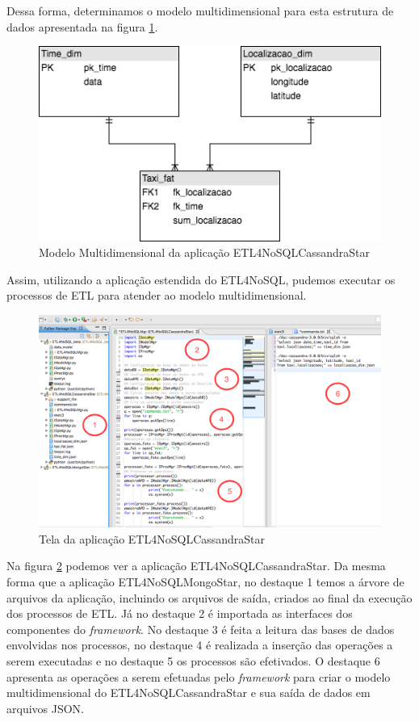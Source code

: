 Dessa forma, determinamos o modelo multidimensional para esta estrutura de dados apresentada na figura \ref{cassandramultidim}.

\begin{figure}[h!]
	\centering
	\includegraphics[scale=0.5]{fig/cassandra_multidim.png}
	\caption{Modelo Multidimensional da aplicação ETL4NoSQLCassandraStar}
	\label{cassandramultidim}
\end{figure}

Assim, utilizando a aplicação estendida do ETL4NoSQL, pudemos executar os processos de ETL para atender ao modelo multidimensional.

\begin{figure}[h!]
	\centering
	\includegraphics[scale=0.4]{fig/ETL4NoSQLCassandraStar.png}
	\caption{Tela da aplicação ETL4NoSQLCassandraStar}
	\label{ETL4NoSQLCassandraStar}
\end{figure}

Na figura \ref{ETL4NoSQLCassandraStar} podemos ver a aplicação ETL4NoSQLCassandraStar. Da mesma forma que a aplicação ETL4NoSQLMongoStar, no destaque 1 temos a árvore de arquivos da aplicação, incluindo os arquivos de saída, criados ao final da execução dos processos de ETL. Já no destaque 2 é importada as interfaces dos componentes do \textit{framework}. No destaque 3 é feita a leitura das bases de dados envolvidas nos processos, no destaque 4 é realizada a inserção das operações a serem executadas e no destaque 5 os processos são efetivados. O destaque 6 apresenta as operações a serem efetuadas pelo \textit{framework} para criar o modelo multidimensional do ETL4NoSQLCassandraStar e sua saída de dados em arquivos JSON.


